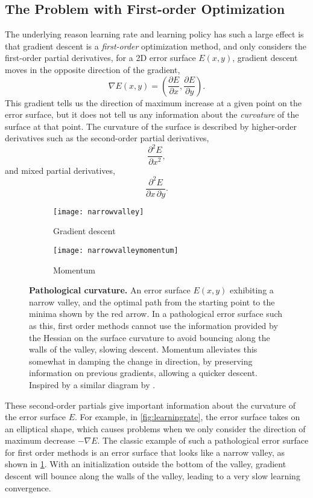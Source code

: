 \documentclass[thesis]{subfiles}
\begin{document}
\subsection{The Problem with First-order Optimization}
The underlying reason learning rate and learning policy has such a large effect is that gradient descent is a \emph{first-order} optimization method, and only considers the first-order partial derivatives, \ie for a 2D error surface $E(x, y)$, gradient descent moves in the opposite direction of the gradient,
\begin{equation}
    \nabla E(x, y) = {\left(\frac{\partial E}{\partial x}, \frac{\partial E}{\partial y}\right)}.
\end{equation}
This gradient tells us the direction of maximum increase at a given point on the error surface, but it does not tell us any information about the \emph{curvature} of the surface at that point. The curvature of the surface is described by higher-order derivatives such as the second-order partial derivatives, \eg
\begin{equation}
    \frac{\partial^2 E}{\partial x^2},
\end{equation}
and mixed partial derivatives, \eg
\begin{equation}
    \frac{\partial^2 E}{\partial x\,\partial y}.
\end{equation}

\begin{figure}[tbp]
\centering
\begin{subfigure}[b]{0.45\textwidth}
\texttt{[image: narrowvalley]}
\caption{Gradient descent}\label{fig:narrowvalleysgd}
\end{subfigure}
\begin{subfigure}[b]{0.45\textwidth}
\texttt{[image: narrowvalleymomentum]}
\caption{Momentum}\label{fig:narrowvalleymomentum}
\end{subfigure}
\caption[Pathological curvature.]{\textbf{Pathological curvature.} An error surface $E(x, y)$ exhibiting a narrow valley, and the optimal path from the starting point to the minima shown by the red arrow. In a pathological error surface such as this, first order methods cannot use the information provided by the Hessian on the surface curvature to avoid bouncing along the walls of the valley, slowing descent. Momentum alleviates this somewhat in damping the change in direction, by preserving information on previous gradients, allowing a quicker descent. Inspired by a similar diagram by \citet{martens2010deep}.}
\label{fig:pathological}
\end{figure}
These second-order partials give important information about the curvature of the error surface $E$. For example, in \cref{fig:learningrate}, the error surface takes on an elliptical shape, which causes problems when we only consider the direction of maximum decrease $-\nabla E$. The classic example of such a pathological error surface for first order methods is an error surface that looks like a narrow valley, as shown in \cref{fig:narrowvalleysgd}. With an initialization outside the bottom of the valley, gradient descent will bounce along the walls of the valley, leading to a very slow learning convergence.
\end{document}
